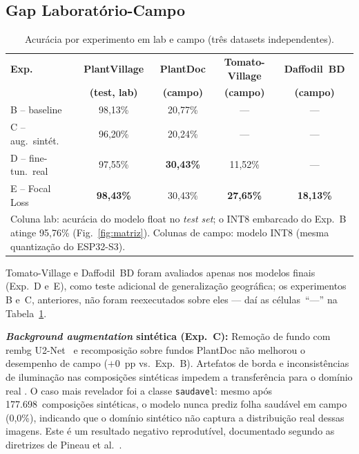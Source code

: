 \documentclass[12pt]{article}
\begin{document}
\subsection{Gap Laboratório-Campo}

\begin{table}[ht]
\centering
\caption{Acurácia por experimento em lab e campo (três datasets independentes).}
\label{tab:gap}
\begin{tabular}{@{}lcccc@{}}
\toprule
\textbf{Exp.} & \textbf{PlantVillage} & \textbf{PlantDoc} & \textbf{Tomato-Village} & \textbf{Daffodil~BD} \\
              & \textbf{(test, lab)}  & \textbf{(campo)}  & \textbf{(campo)}        & \textbf{(campo)} \\
\midrule
B -- baseline      & 98,13\% & 20,77\% & --- & --- \\
C -- aug.\ sintét. & 96,20\% & 20,24\% & --- & --- \\
D -- fine-tun.\ real & 97,55\% & \textbf{30,43\%} & 11,52\% & --- \\
E -- Focal Loss    & \textbf{98,43\%} & 30,43\% & \textbf{27,65\%} & \textbf{18,13\%} \\
\bottomrule
\multicolumn{5}{p{0.95\linewidth}}{\footnotesize Coluna lab: acurácia do modelo
float no \textit{test set}; o INT8 embarcado do Exp.~B atinge 95,76\%
(Fig.~\ref{fig:matriz}). Colunas de campo: modelo INT8 (mesma quantização do ESP32-S3).}
\end{tabular}
\end{table}

Tomato-Village e Daffodil~BD foram avaliados apenas nos modelos finais (Exp.~D e~E),
como teste adicional de generalização geográfica; os experimentos B e~C, anteriores,
não foram reexecutados sobre eles --- daí as células~``---'' na Tabela~\ref{tab:gap}.

\textbf{\textit{Background augmentation} sintética (Exp.~C):} Remoção de fundo com rembg
U2-Net~\cite{qin2020} e recomposição sobre fundos PlantDoc não melhorou o
desempenho de campo ($+$0~pp vs.\ Exp.~B). Artefatos de borda e inconsistências de
iluminação nas composições sintéticas impedem a transferência para o domínio real
\cite{ganin2016}. O caso mais revelador foi a classe \texttt{saudavel}: mesmo após
177.698~composições sintéticas, o modelo nunca prediz folha saudável em campo
(0,0\%), indicando que o domínio sintético não captura a distribuição real dessas
imagens. Este é um resultado negativo reprodutível, documentado segundo as
diretrizes de Pineau et al.~\cite{pineau2021}.
\end{document}
